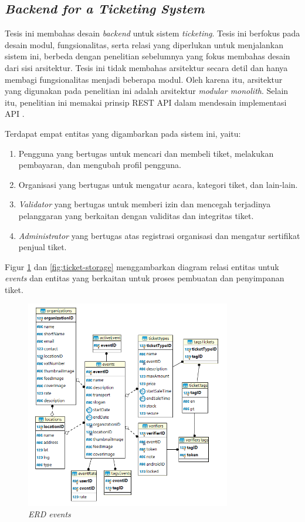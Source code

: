 \subsection{\textit{Backend for a Ticketing System}}

Tesis ini membahas desain \textit{backend} untuk sistem \textit{ticketing}. Tesis ini berfokus pada desain modul, fungsionalitas, serta relasi yang diperlukan untuk menjalankan sistem ini, berbeda dengan penelitian sebelumnya yang fokus membahas desain dari sisi arsitektur. Tesis ini tidak membahas arsitektur secara detil dan hanya membagi fungsionalitas menjadi beberapa modul. Oleh karena itu, arsitektur yang digunakan pada penelitian ini adalah arsitektur \textit{modular monolith}. Selain itu, penelitian ini memakai prinsip REST API dalam mendesain implementasi API \parencite{backendForTicketing}.

Terdapat empat entitas yang digambarkan pada sistem ini, yaitu:

\begin{enumerate}
    \item Pengguna yang bertugas untuk mencari dan membeli tiket, melakukan pembayaran, dan mengubah profil pengguna.
    \item Organisasi yang bertugas untuk mengatur acara, kategori tiket, dan lain-lain.
    \item \textit{Validator} yang bertugas untuk memberi izin dan mencegah terjadinya pelanggaran yang berkaitan dengan validitas dan integritas tiket.
    \item \textit{Administrator} yang bertugas atas registrasi organisasi dan mengatur sertifikat penjual tiket.
\end{enumerate}

Figur \ref{fig:event-rm} dan \ref{fig:ticket-storage} menggambarkan diagram relasi entitas untuk \textit{events} dan entitas yang berkaitan untuk proses pembuatan dan penyimpanan tiket.

\begin{figure}[ht]
    \centering
    \includegraphics[width=0.8\textwidth]{resources/chapter-2/event-rm.png}
    \caption{\textit{ERD events} \parencite{backendForTicketing}}
    \label{fig:event-rm}
\end{figure}

